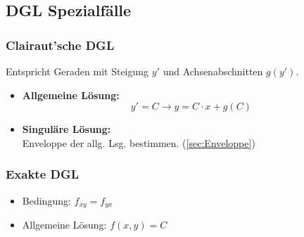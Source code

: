 \subsection{DGL Spezialfälle}
    \subsubsection{Clairaut'sche DGL}
        Entspricht Geraden mit Steigung $y'$ und Achsenabschnitten $g(y')$.
        \begin{itemize}
            \item \textbf{Allgemeine Lösung:}
            $$
                y' = C \rightarrow y = C\cdot x + g(C)
            $$
            \item \textbf{Singuläre Lösung:}\\
                Enveloppe der allg. Lsg. bestimmen. (\ref{sec:Enveloppe})
        \end{itemize}

    \subsubsection{Exakte DGL}
        \vspace{0.5em}
        \begin{itemize}
            \item Bedingung: $f_{xy} = f_{yx}$
            \item Allgemeine Lösung: $f(x,y) = C$
        \end{itemize}